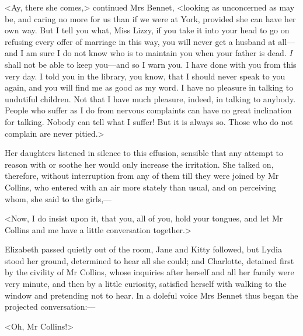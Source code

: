 <Ay, there she comes,> continued Mrs Bennet, <looking as unconcerned as may be, and caring no more for us than if we were at York, provided she can have her own way. But I tell you what, Miss Lizzy, if you take it into your head to go on refusing every offer of marriage in this way, you will never get a husband at all—and I am sure I do not know who is to maintain you when your father is dead. \textit{I} shall not be able to keep you—and so I warn you. I have done with you from this very day. I told you in the library, you know, that I should never speak to you again, and you will find me as good as my word. I have no pleasure in talking to undutiful children. Not that I have much pleasure, indeed, in talking to anybody. People who suffer as I do from nervous complaints can have no great inclination for talking. Nobody can tell what I suffer! But it is always so. Those who do not complain are never pitied.>

Her daughters listened in silence to this effusion, sensible that any attempt to reason with or soothe her would only increase the irritation. She talked on, therefore, without interruption from any of them till they were joined by Mr Collins, who entered with an air more stately than usual, and on perceiving whom, she said to the girls,—

<Now, I do insist upon it, that you, all of you, hold your tongues, and let Mr Collins and me have a little conversation together.>

Elizabeth passed quietly out of the room, Jane and Kitty followed, but Lydia stood her ground, determined to hear all she could; and Charlotte, detained first by the civility of Mr Collins, whose inquiries after herself and all her family were very minute, and then by a little curiosity, satisfied herself with walking to the window and pretending not to hear. In a doleful voice Mrs Bennet thus began the projected conversation:—

<Oh, Mr Collins!>

